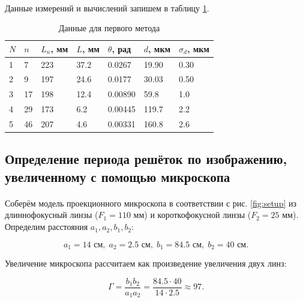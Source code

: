 \documentclass[a4paper,12pt]{article} %
\begin{document}
\paragraph{} Данные измерений и вычислений запишем в таблицу \ref{tab:1met}.

\begin{table}[]
\centering
\begin{tabular}{|l|l|l|l|l|l|l|}
\hline
$N$ & $n$ & $L_n$, мм & $L$,  мм & $\theta$, рад & $d$, мкм & $\sigma_d$, мкм \\ \hline
1   & 7   & 223       & 37.2     & 0.0267        & 19.90    & 0.30            \\ \hline
2   & 9   & 197       & 24.6     & 0.0177        & 30.03    & 0.50            \\ \hline
3   & 17  & 198       & 12.4     & 0.00890       & 59.8     & 1.0             \\ \hline
4   & 29  & 173       & 6.2      & 0.00445       & 119.7    & 2.2             \\ \hline
5   & 46  & 207       & 4.6      & 0.00331       & 160.8    & 2.6             \\ \hline
\end{tabular}
\caption{Данные для первого метода}
\label{tab:1met}
\end{table}

\subsection{Определение периода решёток по изображению, увеличенному с помощью микроскопа}

\paragraph{} Соберём модель проекционного микроскопа в соответствии с рис. \ref{fig:setup} из длиннофокусный линзы ($F_1 = 110$ мм) и короткофокусной линзы ($F_2 = 25$ мм). Определим расстояния $a_1, a_2, b_1, b_2$:

\[
a_1 = 14 \text{ см}, \; a_2 = 2.5 \text{ см}, \; b_1 = 84.5 \text{ см}, \; b_2 = 40 \text{ см}.
\]

\noindent Увеличение микроскопа рассчитаем как произведение увеличения двух линз:

\begin{equation}
\Gamma = \frac{b_1 b_2}{a_1 a_2} = \frac{84.5 \cdot 40}{14 \cdot 2.5} \approx 97.
\label{e:mag}
\end{equation}
\end{document}
